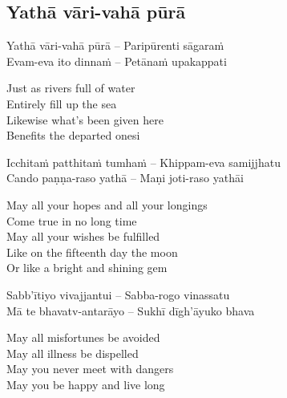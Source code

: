 \subsection{Yathā vāri-vahā pūrā}
\label{yatha-vari-vaha-pura}

\begin{twochants}
  Yathā vāri-vahā pūrā – Paripūrenti sāgaraṁ\\
  Evam-eva ito dinnaṁ – Petānaṁ upakappati
\end{twochants}

\begin{english}
  Just as rivers full of water\\
  Entirely fill up the sea\\
  Likewise what’s been given here\\
  Benefits the departed onesi
\end{english}

\suttaRef{[Khp 1.7]}

\begin{twochants}
  Icchitaṁ patthitaṁ tumhaṁ – Khippam-eva samijjhatu\\
  Cando paṇṇa-raso yathā – Maṇi joti-raso yathāi
\end{twochants}

\begin{english}
  May all your hopes and all your longings\\
  Come true in no long time\\
  May all your wishes be fulfilled\\
  Like on the fifteenth day the moon\\
  Or like a bright and shining gem
\end{english}

\begin{twochants}
  Sabb’ītiyo vivajjantui – Sabba-rogo vinassatu\\
  Mā te bhavatv-antarāyo – Sukhī dīgh’āyuko bhava
\end{twochants}

\begin{english}
  May all misfortunes be avoided\\
  May all illness be dispelled\\
  May you never meet with dangers\\
  May you be happy and live long
\end{english}

\suttaRef{[Khp A]}


